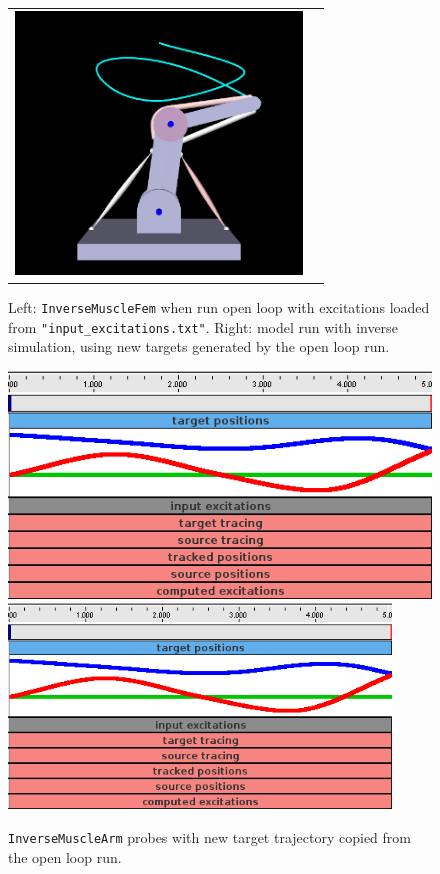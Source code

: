\begin{figure}[ht]
\begin{center}
\begin{tabular}{cc}
      \includegraphics[width=3in]{images/InverseMuscleArmFixed}
   \fi
\end{tabular}
\end{center}
\caption{Left: {\tt InverseMuscleFem} when run open loop with excitations
loaded from {\tt "input\_excitations.txt"}. Right: model run
with inverse simulation, using new targets generated by the
open loop run.}
\label{InverseMuscleArmError:fig}
\end{figure}

\begin{figure}[ht]
\begin{center}
\iflatexml
   \includegraphics[]{images/InverseMuscleArmProbesNew}
\else
   \includegraphics[width=4in]{images/InverseMuscleArmProbesNew}
\fi
\end{center}
\caption{{\tt InverseMuscleArm} probes with new target trajectory copied
from the open loop run.}
\label{InverseMuscleArmProbesNew:fig}
\end{figure}



